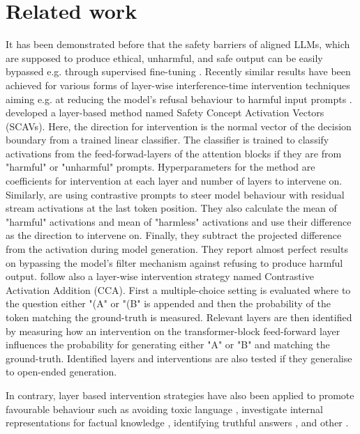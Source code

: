 \section{Related work}
It has been demonstrated before that the safety barriers of aligned LLMs, which are supposed to produce ethical, unharmful, and safe output can be easily bypassed e.g. through supervised fine-tuning \cite{gopal2023will,lermen2023lora}.
Recently similar results have been achieved for various forms of layer-wise interference-time intervention techniques aiming e.g. at reducing the model's refusal behaviour to harmful input prompts \cite{arditi2024refusal, xu2024uncovering, rimsky2023steering}. %
\citet{xu2024uncovering} developed a layer-based method named Safety Concept Activation Vectors (SCAVs). Here, the direction for intervention is the normal vector of the decision boundary from a trained linear classifier. The classifier is trained to classify activations from the feed-forwad-layers of the attention blocks if they are from "harmful" or "unharmful" prompts. Hyperparameters for the method are coefficients for intervention at each layer and number of layers to intervene on. Similarly, \citet{arditi2024refusal} are using contrastive prompts to steer model behaviour with residual stream activations at the last token position. They also calculate the mean of "harmful" activations and mean of "harmless" activations and use their difference as the direction to intervene on. Finally, they subtract the projected difference from the activation during model generation. They report almost perfect results on bypassing the model's filter mechanism against refusing to produce harmful output.
\citet{rimsky2023steering} follow also a layer-wise intervention strategy named Contrastive Activation Addition (CCA). First a multiple-choice setting is evaluated where to the question either "(A" or "(B" is appended and then the probability of the token matching the ground-truth is measured. Relevant layers are then identified by measuring how an intervention on the transformer-block feed-forward layer influences the probability for generating either "A" or "B" and matching the ground-truth. Identified layers and interventions are also tested if they generalise to open-ended generation. 
\par
In contrary, layer based intervention strategies have also been applied to promote favourable behaviour such as avoiding toxic language \cite{jorgensen2023improving}, investigate internal representations for factual knowledge \cite{marks2023geometry}, identifying truthful answers \cite{li2024inference, qiu2024spectral}, and other \cite{turner2023activation, van2024extending}.

